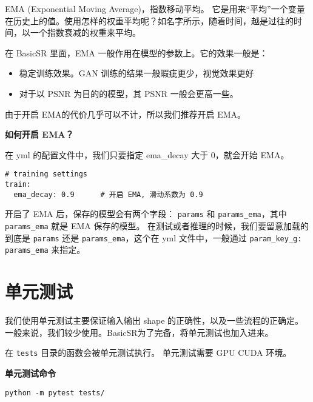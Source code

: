 \documentclass[../main.tex]{subfiles}
\begin{document}
EMA (Exponential Moving Average)，指数移动平均。
它是用来“平均”一个变量在历史上的值。使用怎样的权重平均呢？如名字所示，随着时间，越是过往的时间，以一个指数衰减的权重来平均。

在 BasicSR 里面，EMA 一般作用在模型的参数上。它的效果一般是：

\begin{itemize}
    \item 稳定训练效果。GAN 训练的结果一般瑕疵更少，视觉效果更好
    \item 对于以 PSNR 为目的的模型，其 PSNR 一般会更高一些。
\end{itemize}

由于开启 EMA的代价几乎可以不计，所以我们推荐开启 EMA。

\begin{hl} %
    \textbf{如何开启 EMA？}

    在 yml 的配置文件中，我们只要指定 ema\_decay 大于 0，就会开始 EMA。


    \begin{verbatim}
# training settings
train:
  ema_decay: 0.9      # 开启 EMA, 滑动系数为 0.9
\end{verbatim}
\end{hl}

开启了 EMA 后，保存的模型会有两个字段： \texttt{params} 和 \texttt{params\_ema}，其中  \texttt{params\_ema} 就是 EMA 保存的模型。
在测试或者推理的时候，我们要留意加载的到底是 \texttt{params} 还是 \texttt{params\_ema}，这个在 yml 文件中，一般通过  \texttt{param\_key\_g: params\_ema} 来指定。


\section{单元测试}

我们使用单元测试主要保证输入输出 shape 的正确性，以及一些流程的正确定。
一般来说，我们较少使用。BasicSR为了完备，将单元测试也加入进来。

在 \texttt{tests} 目录的函数会被单元测试执行。
单元测试需要 GPU CUDA 环境。


\begin{hl} %
    \textbf{单元测试命令}


    \begin{verbatim}
python -m pytest tests/
    \end{verbatim}
\end{hl}
\end{document}
